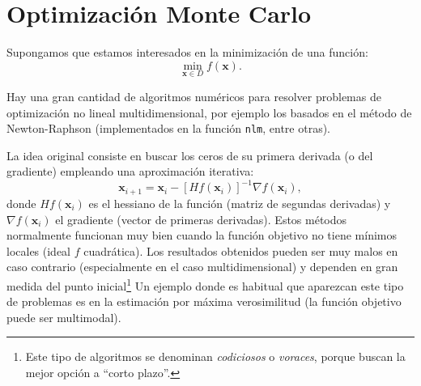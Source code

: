 \documentclass[
]{book}
\theoremstyle{break}
\theoremstyle{nonumberplain}
\begin{document}
\hypertarget{opt-MC}{%
\section{Optimización Monte Carlo}\label{opt-MC}}

Supongamos que estamos interesados en la minimización de una función:
\[\underset{\mathbf{x}\in D}{\min }f(\mathbf{x}).\]

Hay una gran cantidad de algoritmos numéricos para resolver problemas de optimización no lineal multidimensional, por ejemplo los basados en el método de Newton-Raphson (implementados en la función \texttt{nlm}, entre otras).

La idea original consiste en buscar los ceros de su primera derivada (o del gradiente) empleando una aproximación iterativa:
\[\mathbf{x}_{i+1} = \mathbf{x}_i-[Hf(\mathbf{x}_i)]^{-1}\nabla f(\mathbf{x}_i),\]
donde \(Hf(\mathbf{x}_i)\) es el hessiano de la función (matriz de segundas derivadas) y \(\nabla f(\mathbf{x}_i)\) el gradiente (vector de primeras derivadas).
Estos métodos normalmente funcionan muy bien cuando la función objetivo no tiene mínimos locales (ideal \(f\) cuadrática).
Los resultados obtenidos pueden ser muy malos en caso contrario (especialmente en el caso multidimensional) y dependen en gran medida del punto inicial\footnote{Este tipo de algoritmos se denominan \emph{codiciosos} o \emph{voraces}, porque buscan la mejor opción a ``corto plazo''.}
Un ejemplo donde es habitual que aparezcan este tipo de problemas es en la estimación por máxima verosimilitud (la función objetivo puede ser multimodal).
\end{document}

